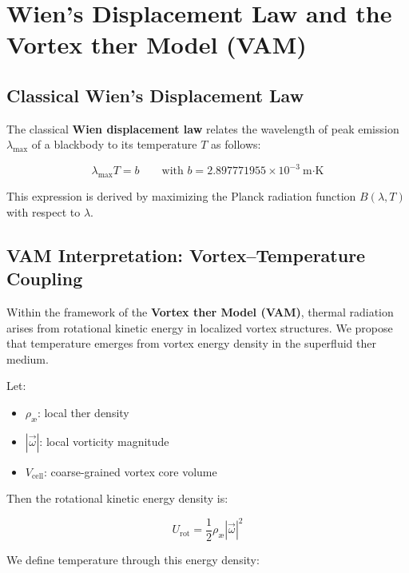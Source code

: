 \section{Wien's Displacement Law and the Vortex \text{\ae}ther Model (VAM)}

\subsection{Classical Wien's Displacement Law}

The classical \textbf{Wien displacement law} relates the wavelength of peak emission \( \lambda_{\text{max}} \) of a blackbody to its temperature \( T \) as follows:

\begin{equation}
\boxed{
\lambda_{\text{max}} T = b
}
\qquad \text{with } b = 2.897771955 \times 10^{-3}~\text{m·K}
\label{eq:wien-law}
\end{equation}

This expression is derived by maximizing the Planck radiation function \( B(\lambda, T) \) with respect to \( \lambda \).

\subsection{VAM Interpretation: Vortex–Temperature Coupling}

Within the framework of the \textbf{Vortex \text{\ae}ther Model (VAM)}, thermal radiation arises from rotational kinetic energy in localized vortex structures. We propose that temperature emerges from vortex energy density in the superfluid \text{\ae}ther medium.

Let:

\begin{itemize}
  \item \( \rho_\text{\ae} \): local \text{\ae}ther density
  \item \( |\vec{\omega}| \): local vorticity magnitude
  \item \( V_{\text{cell}} \): coarse-grained vortex core volume
\end{itemize}

Then the rotational kinetic energy density is:

\begin{equation}
U_{\text{rot}} = \frac{1}{2} \rho_\text{\ae} |\vec{\omega}|^2
\end{equation}

We define temperature through this energy density:

